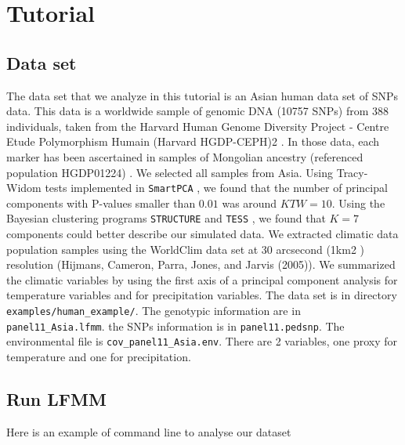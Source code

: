 \documentclass[10pt,a4paper]{article}
\begin{document}
\section{Tutorial}

\subsection{Data set}
The data set that we analyze in this tutorial is an Asian human data set of SNPs data.
This data is a worldwide sample of genomic DNA (10757 SNPs) from 388 individuals,
taken from the Harvard Human Genome Diversity Project - Centre
Etude Polymorphism Humain (Harvard HGDP-CEPH)2 . In those
data, each marker has been ascertained in samples of Mongolian
ancestry (referenced population HGDP01224) \cite{Patterson_2012}. We selected all
samples from Asia.
Using Tracy-Widom tests implemented in {\tt SmartPCA} \cite{Patterson_2006}, we found that the number of
principal components with P-values smaller than $0.01$ was around $KTW = 10$. Using
the Bayesian clustering programs {\tt STRUCTURE} \cite{Pritchard_2000} and 
{\tt TESS} \cite{Chen_2007, Durand_2009}, we found that $K = 7$
components could better describe our simulated data.
We extracted climatic data population samples using the WorldClim
data set at 30 arcsecond (1km2 ) resolution
(Hijmans, Cameron, Parra, Jones, and Jarvis (2005)).
We summarized the climatic variables by using the first axis of a
principal component analysis for temperature variables and for
precipitation variables.
The data set is in directory \verb|examples/human_example/|. The genotypic information
are in \verb|panel11_Asia.lfmm|. the SNPs information is in \verb|panel11.pedsnp|.
The environmental file is \verb|cov_panel11_Asia.env|. There are 2 variables, one proxy
for temperature and one for precipitation.

\subsection{Run LFMM}
Here is an example of command line to analyse our dataset
\end{document}
